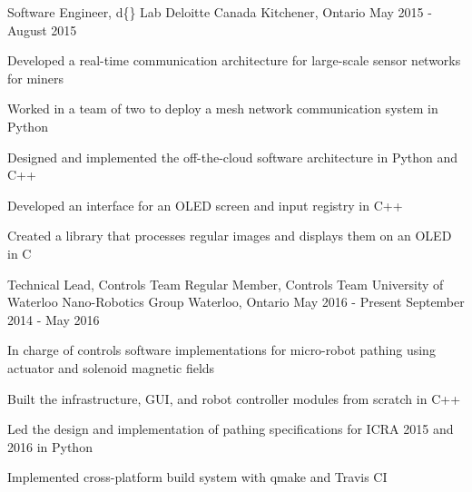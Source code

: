 \begin{cventries}

\cventry
{Software Engineer, d\{\} Lab}
{Deloitte Canada} %
{Kitchener, Ontario} %
{May 2015 - August 2015} %
{
Developed a real-time communication architecture for large-scale sensor networks for miners
\begin{cvitems}
\item[]
\item {Worked in a team of two to deploy a mesh network communication system in Python}
\item {Designed and implemented the off-the-cloud software architecture in Python and C++}
\item {Developed an interface for an OLED screen and input registry in C++}
\item {Created a library that processes regular images and displays them on an OLED in C}
\end{cvitems}
}


\cventry
{Technical Lead, Controls Team \newline {\vspace{-.75mm}}
Regular Member, Controls Team}
{University of Waterloo Nano-Robotics Group}
{Waterloo, Ontario}
{May 2016 - Present \newline {\vspace{-1mm}}
September 2014 - May 2016} %
{ %
In charge of controls software implementations for micro-robot pathing using actuator and solenoid magnetic fields
\begin{cvitems}
\item[]
\item {Built the infrastructure, GUI, and robot controller modules from scratch in C++}
\item {Led the design and implementation of pathing specifications for ICRA 2015 and 2016 in Python}
\item {Implemented cross-platform build system with qmake and Travis CI}
\end{cvitems} 
}


\end{cventries}
